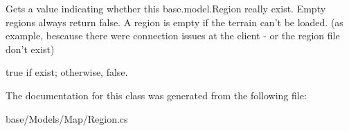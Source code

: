 Gets a value indicating whether this base.\-model.\-Region really exist. Empty regions always return false. A region is empty if the terrain can't be loaded. (as example, bescause there were connection issues at the client -\/ or the region file don't exist) 

{\ttfamily true} if exist; otherwise, {\ttfamily false}.

The documentation for this class was generated from the following file\-:\begin{DoxyCompactItemize}
\item 
base/\-Models/\-Map/Region.\-cs\end{DoxyCompactItemize}
